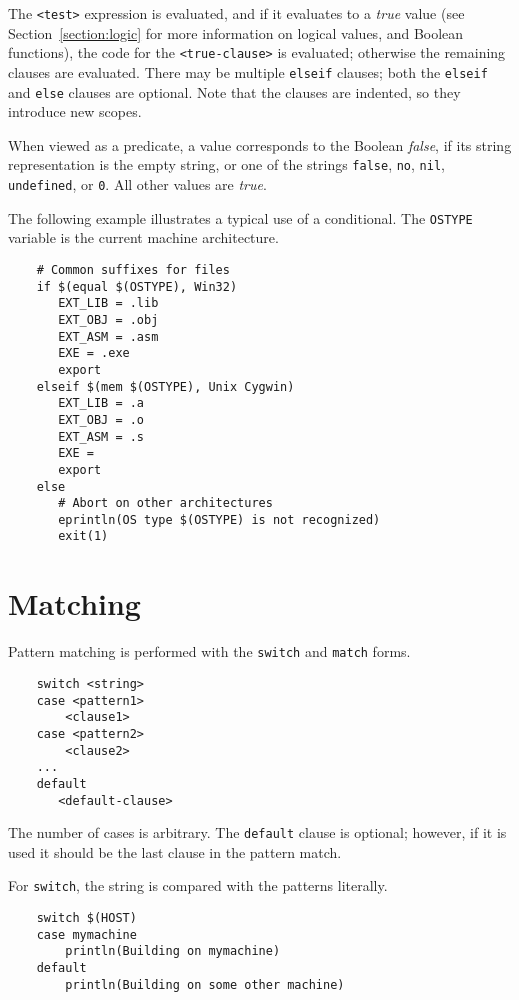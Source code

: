 The \verb+<test>+ expression is evaluated, and if it evaluates to a \emph{true} value (see
Section~\ref{section:logic} for more information on logical values, and Boolean functions), the code
for the \verb+<true-clause>+ is evaluated; otherwise the remaining clauses are evaluated.  There may
be multiple \verb+elseif+ clauses; both the \verb+elseif+ and \verb+else+ clauses are optional.
Note that the clauses are indented, so they introduce new scopes.

When viewed as a predicate, a value corresponds to the Boolean \emph{false}, if its string
representation is the empty string, or one of the strings \verb+false+, \verb+no+, \verb+nil+,
\verb+undefined+, or \verb+0+.  All other values are \emph{true}.

The following example illustrates a typical use of a conditional.  The
\verb+OSTYPE+ variable is the current machine architecture.

\begin{verbatim}
    # Common suffixes for files
    if $(equal $(OSTYPE), Win32)
       EXT_LIB = .lib
       EXT_OBJ = .obj
       EXT_ASM = .asm
       EXE = .exe
       export
    elseif $(mem $(OSTYPE), Unix Cygwin)
       EXT_LIB = .a
       EXT_OBJ = .o
       EXT_ASM = .s
       EXE =
       export
    else
       # Abort on other architectures
       eprintln(OS type $(OSTYPE) is not recognized)
       exit(1)
\end{verbatim}

\section{Matching}
\label{section:match}

Pattern matching is performed with the \verb+switch+ and \verb+match+ forms.

\begin{verbatim}
    switch <string>
    case <pattern1>
        <clause1>
    case <pattern2>
        <clause2>
    ...
    default
       <default-clause>
\end{verbatim}

The number of cases is arbitrary.
The \verb+default+ clause is optional; however, if it is used it should
be the last clause in the pattern match.

For \verb+switch+, the string is compared with the patterns literally.

\begin{verbatim}
    switch $(HOST)
    case mymachine
        println(Building on mymachine)
    default
        println(Building on some other machine)
\end{verbatim}


